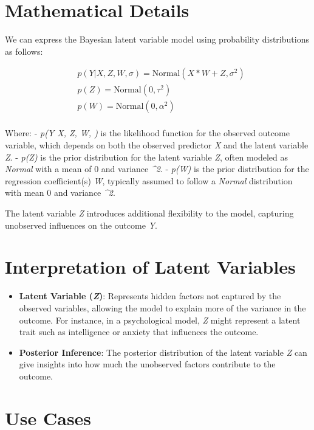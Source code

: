 \documentclass[
  letterpaper,
  DIV=11,
  numbers=noendperiod]{scrreprt}
\begin{document}
\section{Mathematical Details}\label{mathematical-details-17}

We can express the Bayesian latent variable model using probability
distributions as follows:

\[
\begin{aligned}
& p(Y | X, Z, W, \sigma) = \text{Normal}(X * W + Z, \sigma^2) \\
& p(Z) = \text{Normal}(0, \tau^2) \\
& p(W) = \text{Normal}(0, \alpha^2) \\
\end{aligned}
\]

Where: - \emph{p(Y \textbar{} X, Z, W, \sigma)} is the likelihood
function for the observed outcome variable, which depends on both the
observed predictor \emph{X} and the latent variable \emph{Z}. -
\emph{p(Z)} is the prior distribution for the latent variable \emph{Z},
often modeled as \emph{Normal} with a mean of 0 and variance
\emph{\tau\^{}2}. - \emph{p(W)} is the prior distribution for the
regression coefficient(s) \emph{W}, typically assumed to follow a
\emph{Normal} distribution with mean 0 and variance \emph{\alpha\^{}2}.

The latent variable \emph{Z} introduces additional flexibility to the
model, capturing unobserved influences on the outcome \emph{Y}.

\section{Interpretation of Latent
Variables}\label{interpretation-of-latent-variables}

\begin{itemize}
\item
  \textbf{Latent Variable (\emph{Z})}: Represents hidden factors not
  captured by the observed variables, allowing the model to explain more
  of the variance in the outcome. For instance, in a psychological
  model, \emph{Z} might represent a latent trait such as intelligence or
  anxiety that influences the outcome.
\item
  \textbf{Posterior Inference}: The posterior distribution of the latent
  variable \emph{Z} can give insights into how much the unobserved
  factors contribute to the outcome.
\end{itemize}

\section{Use Cases}\label{use-cases}
\end{document}
